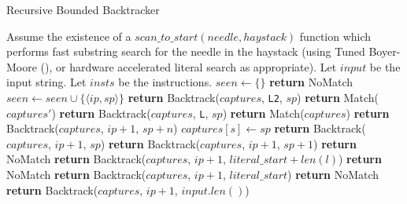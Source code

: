 \begin{algorithm}
\caption{Recursive Bounded Backtracker}
\label{algo:recurboundedback}

\begin{algorithmic}
\State Assume the existence of a $scan\_to\_start(needle, haystack)$ function
        which performs fast substring search for the needle in the haystack
        (using Tuned Boyer-Moore (\cite{Hume1991}),
        or hardware accelerated literal search as appropriate).
\State Let $input$ be the input string.
\State Let $insts$ be the instructions.
\State $seen \gets \{\}$
    \State \textbf{return} NoMatch
  \EndIf
  \State $seen \gets seen \cup \{\langle ip, sp \rangle\}$
          \State \textbf{return} Backtrack($captures$, {\tt L2}, $sp$)
        \EndCase
          \State \textbf{return} Match($captures'$)
        \EndCase
      \EndSwitch
    \EndCase
      \State \textbf{return} Backtrack($captures$, {\tt L}, $sp$)
    \EndCase
      \State \textbf{return} Match($captures$)
    \EndCase
      \State \textbf{return} Backtrack($captures$, $ip + 1$, $sp + n$)
    \EndCase
      \State $captures[s] \gets sp$
      \State \textbf{return} Backtrack($captures$, $ip + 1$, $sp$)
    \EndCase
        \State \textbf{return} Backtrack($captures$, $ip + 1$, $sp + 1$)
      \Else
        \State \textbf{return} NoMatch
      \EndIf
    \EndCase
        \State \textbf{return}
            Backtrack($captures$, $ip + 1$, $literal\_start + len(l)$)
      \Else
        \State \textbf{return} NoMatch
      \EndIf
    \EndCase
        \State \textbf{return}
                  Backtrack($captures$, $ip + 1$, $literal\_start$)
      \Else
        \State \textbf{return} NoMatch
      \EndIf
    \EndCase
      \State \textbf{return} Backtrack($captures$, $ip + 1$, $input.len()$)
    \EndCase
  \EndSwitch
\EndProcedure
\end{algorithmic}
\end{algorithm}

